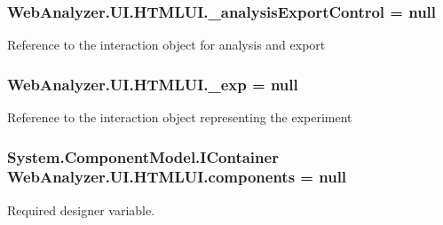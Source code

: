 \subsubsection[{\+\_\+analysis\+Export\+Control}]{ Web\+Analyzer.\+U\+I.\+H\+T\+M\+L\+U\+I.\+\_\+analysis\+Export\+Control = null\hspace{0.3cm}{\ttfamily [private]}}\label{class_web_analyzer_1_1_u_i_1_1_h_t_m_l_u_i_acf16c624451c1154268d8fe9fe82e62c}


Reference to the interaction object for analysis and export 

\hypertarget{class_web_analyzer_1_1_u_i_1_1_h_t_m_l_u_i_a39034582b0bcec2f24942ba2661829ec}{}
\subsubsection[{\+\_\+exp}]{ Web\+Analyzer.\+U\+I.\+H\+T\+M\+L\+U\+I.\+\_\+exp = null\hspace{0.3cm}{\ttfamily [private]}}\label{class_web_analyzer_1_1_u_i_1_1_h_t_m_l_u_i_a39034582b0bcec2f24942ba2661829ec}


Reference to the interaction object representing the experiment 

\hypertarget{class_web_analyzer_1_1_u_i_1_1_h_t_m_l_u_i_ad803fa08573756d8039c07fbfd62c851}{}
\subsubsection[{components}]{\setlength{\rightskip}{0pt plus 5cm}System.\+Component\+Model.\+I\+Container Web\+Analyzer.\+U\+I.\+H\+T\+M\+L\+U\+I.\+components = null\hspace{0.3cm}{\ttfamily [private]}}\label{class_web_analyzer_1_1_u_i_1_1_h_t_m_l_u_i_ad803fa08573756d8039c07fbfd62c851}


Required designer variable. 

\hypertarget{class_web_analyzer_1_1_u_i_1_1_h_t_m_l_u_i_a5f4700cfc8d03cdc4927814acbd0a5dc}{}
